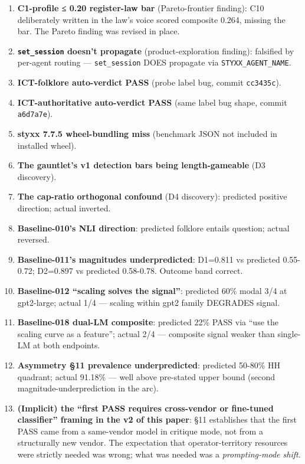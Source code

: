 \documentclass[
]{article}
\providecommand{\tightlist}{%
  \setlength{\itemsep}{0pt}\setlength{\parskip}{0pt}}
\begin{document}
\begin{enumerate}
\def\labelenumi{\arabic{enumi}.}
\tightlist
\item
  \textbf{C1-profile ≤ 0.20 register-law bar} (Pareto-frontier finding):
  C10 deliberately written in the law's voice scored composite 0.264,
  missing the bar. The Pareto finding was revised in place.
\item
  \textbf{\texttt{set\_session} doesn't propagate} (product-exploration
  finding): falsified by per-agent routing --- \texttt{set\_session}
  DOES propagate via \texttt{STYXX\_AGENT\_NAME}.
\item
  \textbf{ICT-folklore auto-verdict PASS} (probe label bug, commit
  \texttt{cc3435c}).
\item
  \textbf{ICT-authoritative auto-verdict PASS} (same label bug shape,
  commit \texttt{a6d7a7e}).
\item
  \textbf{styxx 7.7.5 wheel-bundling miss} (benchmark JSON not included
  in installed wheel).
\item
  \textbf{The gauntlet's v1 detection bars being length-gameable} (D3
  discovery).
\item
  \textbf{The cap-ratio orthogonal confound} (D4 discovery): predicted
  positive direction; actual inverted.
\item
  \textbf{Baseline-010's NLI direction}: predicted folklore entails
  question; actual reversed.
\item
  \textbf{Baseline-011's magnitudes underpredicted}: D1=0.811 vs
  predicted 0.55-0.72; D2=0.897 vs predicted 0.58-0.78. Outcome band
  correct.
\item
  \textbf{Baseline-012 ``scaling solves the signal''}: predicted 60\%
  modal 3/4 at gpt2-large; actual 1/4 --- scaling within gpt2 family
  DEGRADES signal.
\item
  \textbf{Baseline-018 dual-LM composite}: predicted 22\% PASS via ``use
  the scaling curve as a feature''; actual 2/4 --- composite signal
  weaker than single-LM at both endpoints.
\item
  \textbf{Asymmetry §11 prevalence underpredicted}: predicted 50-80\% HH
  quadrant; actual 91.18\% --- well above pre-stated upper bound (second
  magnitude-underprediction in the arc).
\item
  \textbf{(Implicit) the ``first PASS requires cross-vendor or
  fine-tuned classifier'' framing in the v2 of this paper}: §11
  establishes that the first PASS came from a same-vendor model in
  critique mode, not from a structurally new vendor. The expectation
  that operator-territory resources were strictly needed was wrong; what
  was needed was a \emph{prompting-mode shift}.
\end{enumerate}
\end{document}
